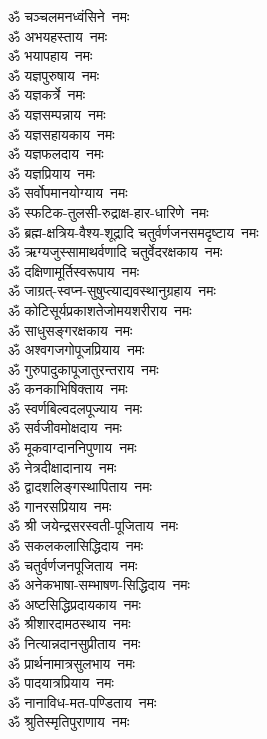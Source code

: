 \begin{flushleft}
\begin{multicols}{2}
ॐ चञ्चलमनध्वंसिने~नमः\\
ॐ अभयहस्ताय~नमः\\
ॐ भयापहाय~नमः\\
ॐ यज्ञपुरुषाय~नमः\hfill{}\\
ॐ यज्ञकर्त्रे~नमः\\
ॐ यज्ञसम्पन्नाय~नमः\\
ॐ यज्ञसहायकाय~नमः\\
ॐ यज्ञफलदाय~नमः\\
ॐ यज्ञप्रियाय~नमः\\
ॐ सर्वोपमानयोग्याय~नमः\\
ॐ स्फटिक-तुलसी-रुद्राक्ष-हार-धारिणे~नमः\\
ॐ ब्रह्म-क्षत्रिय-वैश्य-शूद्रादि चतुर्वर्णजनसमदृष्टाय~नमः\\
ॐ ऋग्यजुस्सामाथर्वणादि चतुर्वेदरक्षकाय~नमः\\
ॐ दक्षिणामूर्तिस्वरूपाय~नमः\hfill{}\\
ॐ जाग्रत्-स्वप्न-सुषुप्त्याद्यवस्थानुग्रहाय~नमः\\
ॐ कोटिसूर्यप्रकाशतेजोमय\-शरीराय~नमः\\
ॐ साधुसङ्गरक्षकाय~नमः\\
ॐ अश्वगजगोपूजप्रियाय~नमः\\
ॐ गुरुपादुकापूजातुरन्तराय~नमः\\
ॐ कनकाभिषिक्ताय~नमः\\
ॐ स्वर्णबिल्वदलपूज्याय~नमः\\
ॐ सर्वजीवमोक्षदाय~नमः\\
ॐ मूकवाग्दाननिपुणाय~नमः\\
ॐ नेत्रदीक्षादानाय~नमः\hfill{}\\
ॐ द्वादशलिङ्गस्थापिताय~नमः\\
ॐ गानरसप्रियाय~नमः\\
ॐ श्री जयेन्द्रसरस्वती-पूजिताय~नमः\\
ॐ सकलकलासिद्धिदाय~नमः\\
ॐ चतुर्वर्णजनपूजिताय~नमः\\
ॐ अनेकभाषा-सम्भाषण-सिद्धिदाय~नमः\\
ॐ अष्टसिद्धिप्रदायकाय~नमः\\
ॐ श्रीशारदामठस्थाय~नमः\\
ॐ नित्यान्नदानसुप्रीताय~नमः\\
ॐ प्रार्थनामात्रसुलभाय~नमः\hfill{}\\
ॐ पादयात्रप्रियाय~नमः\\
ॐ नानाविध-मत-पण्डिताय~नमः\\
ॐ श्रुतिस्मृतिपुराणाय~नमः\\

\end{multicols}
\end{flushleft}
